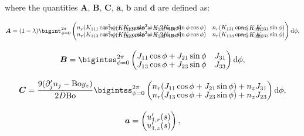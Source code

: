 \documentclass[12pt]{article}
\begin{document}
where the quantities $\boldsymbol{A}$, $\boldsymbol{B}$, $\boldsymbol{C}$, $\boldsymbol{a}$, $\boldsymbol{b}$ and $\boldsymbol{d}$ are defined as:

\begin{equation}
\setlength{\arraycolsep}{5pt}
\renewcommand{\arraystretch}{1.3}
\boldsymbol{A} = (1 - \lambda) \bigint_{\phi = 0}^{2 \pi} \left( \begin{matrix}
   n_{r}(K_{111} \cos^{2}\phi + K_{221} \sin^{2}\phi + 2 K_{121} \sin\phi \cos\phi) &  n_{r}(K_{131} \cos\phi + K_{231} \sin\phi)   \\[-15pt]
{}+n_{z}(K_{131} \cos\phi + K_{231} \sin\phi) & {}+n_{z}K_{331} \\[-5pt]
   n_{r}(K_{113} \cos^{2}\phi + K_{223} \sin^{2}\phi + 2 K_{123} \sin\phi \cos\phi) &   n_{r}(K_{133} \cos\phi + K_{233} \sin\phi)  \\[-15pt]
{}+n_{z}(K_{133} \cos\phi + K_{233} \sin\phi) & {}+n_{z}K_{333} \\
\end{matrix} \right) \mathrm{d}\phi ,
\label{equ:mat_A}
\end{equation}


\begin{equation}
\setlength{\arraycolsep}{5pt}
\renewcommand{\arraystretch}{1.3}
\boldsymbol{B} = \bigintss_{\phi = 0}^{2 \pi} \left( \begin{matrix}
J_{11} \cos\phi + J_{21} \sin\phi & J_{31} \\[-5pt]
J_{13} \cos\phi + J_{23} \sin\phi & J_{33} \\
\end{matrix} \right) \mathrm{d}\phi ,
\label{equ:mat_B}
\end{equation}


\begin{equation}
\setlength{\arraycolsep}{5pt}
\renewcommand{\arraystretch}{1.3}
\boldsymbol{C} = \frac{9(\partial'_{j} n_{j} - \text{Bo} y_{z})}{2 D \text{Bo}} \bigintss_{\phi = 0}^{2 \pi} \left( \begin{matrix}
n_{r} (J_{11} \cos\phi + J_{21} \sin\phi) + n_{z} J_{31} \\[-5pt]
n_{r} (J_{13} \cos\phi + J_{23} \sin\phi) + n_{z} J_{23} \\
\end{matrix} \right) \mathrm{d}\phi ,
\label{equ:mat_C}
\end{equation}


\begin{equation}
\setlength{\arraycolsep}{5pt}
\renewcommand{\arraystretch}{1.3}
\boldsymbol{a} = \left( \begin{matrix}
u'_{1,r}(s) \\[-5pt]
u'_{1,z}(s) \\
\end{matrix} \right),
\label{equ:vec_a}
\end{equation}
\end{document}

